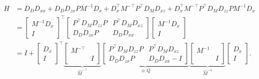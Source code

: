 \documentclass{article}
\begin{document}
\begin{align}
    H & = D_DD_{xx}  + D_DD_{zx} PM^{-1} D_x + D_x^\top M^{-\top}P^\top D_M D_{xz}+D_x^\top M^{-\top}P^\top D_M D_{zz}P M^{-1}D_x \\
    & = \begin{bmatrix}
        M^{-1}D_x \\ I
    \end{bmatrix}
    ^\top
    \begin{bmatrix}
        P^\top D_M D_{zz} P & P^\top D_M D_{xz} \\
        D_D D_{zx} P        & D_D D_{xx}
    \end{bmatrix}
    \begin{bmatrix}
        M^{-1}D_x \\ I
    \end{bmatrix}
    \\
    & = I +  \begin{bmatrix}
        D_x \\ I
    \end{bmatrix}
    ^\top
    \underbrace{\begin{bmatrix}
            M^{-\top} & \\ & I
        \end{bmatrix}
    }_{\hat{M}^{-\top}}
    \underbrace{
        \begin{bmatrix}
            P^\top D_M D_{zz} P & P^\top D_M D_{xz} \\
            D_D D_{zx} P        & D_D D_{xx}-I
        \end{bmatrix}
    }_{\equiv Q}
    \underbrace{\begin{bmatrix}
            M^{-1} & \\ & I
        \end{bmatrix}
    }_{\hat{M}^{-1}}
    \begin{bmatrix}
        D_x \\ I
    \end{bmatrix}
    .
\end{align}
\end{document}
